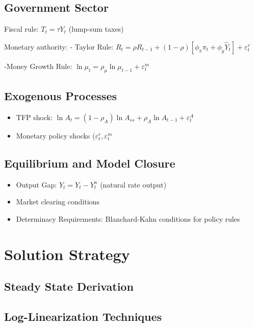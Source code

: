 \documentclass[11pt,preprint]{elsarticle}
\numberwithin{equation}{section}
\numberwithin{figure}{section}
\numberwithin{table}{section}
\begin{document}
\subsection{Government Sector}\label{government-sector}

Fiscal rule: \(T_t = \tau Y_t\) (lump-sum taxes)

Monetary authority: - Taylor Rule:
\(R_t = \rho R_{t-1} + (1-\rho)[\phi_\pi \pi_t + \phi_y \hat{Y}_t] + \varepsilon_t^r\)

-Money Growth Rule:
\(\ln \mu_t = \rho_\mu \ln \mu_{t-1} + \varepsilon_t^m\)

\subsection{Exogenous Processes}\label{exogenous-processes}

\begin{itemize}
\item
  TFP shock:
  \(\ln A_t = (1-\rho_A)\ln A_{ss} + \rho_A \ln A_{t-1} + \varepsilon_t^A\)
\item
  Monetary policy shocks (\(\varepsilon_t^r, \varepsilon_t^m\)
\end{itemize}

\subsection{Equilibrium and Model
Closure}\label{equilibrium-and-model-closure}

\begin{itemize}
\item
  Output Gap: \(\hat{Y}_t = Y_t - Y_t^n\) (natural rate output)
\item
  Market clearing conditions
\item
  Determinacy Requirements: Blanchard-Kahn conditions for policy rules
\end{itemize}

\section{Solution Strategy}\label{solution-strategy}

\subsection{Steady State Derivation}\label{steady-state-derivation}

\subsection{Log-Linearization
Techniques}\label{log-linearization-techniques}
\end{document}
